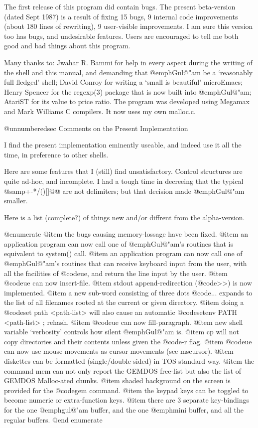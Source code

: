 The first release of this program did contain bugs.  The present
beta-version (dated Sept 1987) is a result of fixing 15 bugs, 9 internal
code improvements (about 180 lines of rewriting), 9 user-visible
improvements.  I am sure this version too has bugs, and undesirable
features.  Users are encouraged to tell me both good and bad things about
this program.


Many thanks to: Jwahar R.  Bammi for help in every aspect during the
writing of the shell and this manual, and demanding that
@emph{Gul@"am} be a `reasonably full fledged' shell; David Conroy for
writing a `small is beautiful' microEmacs; Henry Spencer for the
regexp(3) package that is now built into @emph{Gul@"am}; AtariST for
its value to price ratio.  The program was developed using Megamax and
Mark Williams C compilers.  It now uses my own malloc.c.


@unnumberedsec Comments on the Present Implementation

I find the present implementation eminently useable, and indeed use it
all the time, in preference to other shells.

Here are some features that I (still) find unsatisfactory.  Control
structures are quite ad-hoc, and incomplete.  I had a tough time in
decreeing that the typical @samp{+-*/()[]@{@}} are not delimiters; but
that decision made @emph{Gul@"am} smaller.

Here is a list (complete?) of things new and/or diffrent from the
alpha-version.

@enumerate
@item
the bugs causing memory-lossage have been fixed.
@item
an application program can now call one of @emph{Gul@"am}'s routines
that is equivalent to system() call.
@item
an application program can now call one of @emph{Gul@"am}'s routines
that can receive keyboard input from the user, with all the facilities of
@code{ue}, and return the line input by the user.
@item
@code{ue} can now insert-file.
@item
stdout append-redirection (@code{>>}) is now implemented.
@item
a new sub-word consisting of three dots @code{...} expands to the list
of all filenames rooted at the current or given directory.
@item
doing a @code{set path <path-list>} will also cause an automatic
@code{setenv PATH <path-list> ; rehash}.
@item
@code{ue} can now fill-paragraph.
@item
new shell variable `verbosity' controls how silent @emph{Gul@"am} is.
@item
cp will not copy directories and their contents unless
given the @code{-r} flag.
@item
@code{ue} can now use mouse movements as cursor
movements (see mscursor).
@item
diskettes can be formatted (single/double-sided) in TOS standard way.
@item
the command mem can not only report the GEMDOS free-list but also the list
of GEMDOS Malloc-ated chunks.
@item
shaded background on the screen is provided for the @code{gem} command.
@item
the keypad keys can be toggled to become numeric
or extra-function keys.
@item
there are 3 separate key-bindings for the one @emph{gul@"am} buffer, and
the one @emph{mini} buffer, and all the regular buffers.
@end enumerate

